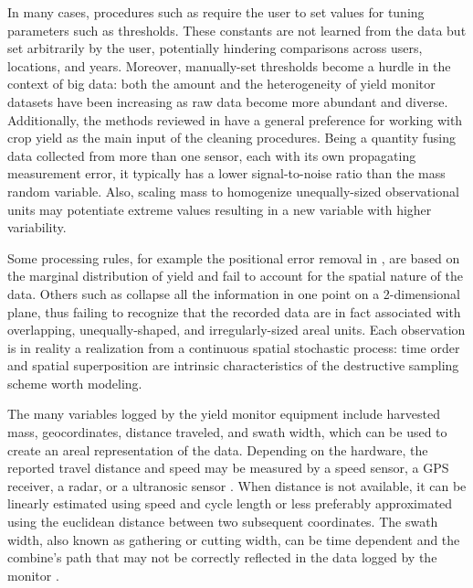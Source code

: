 \documentclass[12pt]{article}
\begin{document}
In many cases, procedures such as \citep{Vega2019} require the user to
set values for tuning parameters such as thresholds. These constants
are not learned from the data but set arbitrarily by the user,
potentially hindering comparisons across users, locations, and
years. Moreover, manually-set thresholds become a hurdle in the
context of big data: both the amount and the heterogeneity of yield
monitor datasets have been increasing as raw data become more abundant
and diverse. Additionally, the methods reviewed in \citep{Lyle2013}
have a general preference for working with crop yield as the main
input of the cleaning procedures. Being a quantity fusing data
collected from more than one sensor, each with its own propagating
measurement error, it typically has a lower signal-to-noise ratio than
the mass random variable. Also, scaling mass to homogenize
unequally-sized observational units may potentiate extreme values
resulting in a new variable with higher variability.

Some processing rules, for example the positional error removal in
\citep{Blackmore1999}, are based on the marginal distribution of yield
and fail to account for the spatial nature of the data. Others such as
\citep{Leroux2018, Vega2019} collapse all the information in one
point on a 2-dimensional plane, thus failing to recognize that the
recorded data are in fact associated with overlapping,
unequally-shaped, and irregularly-sized areal units. Each observation
is in reality a realization from a continuous spatial stochastic
process: time order and spatial superposition are intrinsic
characteristics of the destructive sampling scheme worth modeling.

The many variables logged by the yield monitor equipment include
harvested mass, geocordinates, distance traveled, and swath width,
which can be used to create an areal representation of the
data. Depending on the hardware, the reported travel distance and
speed may be measured by a speed sensor, a GPS receiver, a radar, or a
ultranosic sensor \citep{Mulla2013}. When distance is not available,
it can be linearly estimated using speed and cycle length or less
preferably approximated using the euclidean distance between two
subsequent coordinates. The swath width, also known as gathering or
cutting width, can be time dependent and the combine's path that may
not be correctly reflected in the data logged by the monitor
\citep{Ross2008}.
\end{document}
